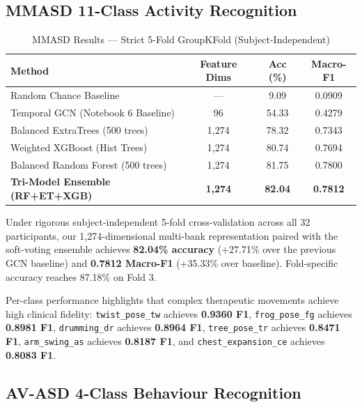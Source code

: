 \documentclass[conference]{IEEEtran}
\begin{document}
\subsection{MMASD 11-Class Activity Recognition}

\begin{table}[h!]
\centering
\caption{MMASD Results — Strict 5-Fold GroupKFold (Subject-Independent)}
\label{tab:mmasd}
\begin{tabular}{lccc}
\toprule
\textbf{Method} & \textbf{Feature Dims} & \textbf{Acc (\%)} & \textbf{Macro-F1} \\
\midrule
Random Chance Baseline & — & 9.09 & 0.0909 \\
Temporal GCN (Notebook 6 Baseline) & 96 & 54.33 & 0.4279 \\
Balanced ExtraTrees (500 trees) & 1,274 & 78.32 & 0.7343 \\
Weighted XGBoost (Hist Trees) & 1,274 & 80.74 & 0.7694 \\
Balanced Random Forest (500 trees) & 1,274 & 81.75 & 0.7800 \\
\textbf{Tri-Model Ensemble (RF+ET+XGB)} & \textbf{1,274} & \textbf{82.04} & \textbf{0.7812} \\
\bottomrule
\end{tabular}
\end{table}

Under rigorous subject-independent 5-fold cross-validation across all 32 participants, our 1,274-dimensional multi-bank representation paired with the soft-voting ensemble achieves \textbf{82.04\% accuracy} (+27.71\% over the previous GCN baseline) and \textbf{0.7812 Macro-F1} (+35.33\% over baseline). Fold-specific accuracy reaches 87.18\% on Fold 3.

Per-class performance highlights that complex therapeutic movements achieve high clinical fidelity: \texttt{twist\_pose\_tw} achieves \textbf{0.9360 F1}, \texttt{frog\_pose\_fg} achieves \textbf{0.8981 F1}, \texttt{drumming\_dr} achieves \textbf{0.8964 F1}, \texttt{tree\_pose\_tr} achieves \textbf{0.8471 F1}, \texttt{arm\_swing\_as} achieves \textbf{0.8187 F1}, and \texttt{chest\_expansion\_ce} achieves \textbf{0.8083 F1}.

\subsection{AV-ASD 4-Class Behaviour Recognition}
\end{document}
